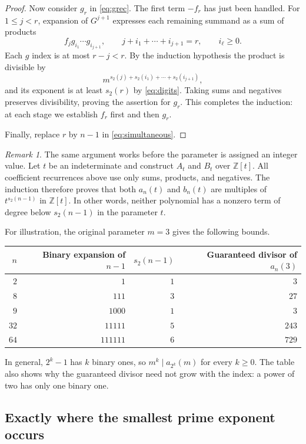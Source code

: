 \documentclass[11pt,a4paper]{article}
\theoremstyle{remark}
\newtheorem{remark}[theorem]{Remark}
\newcommand{\Z}{\mathbb Z}
\begin{document}
\begin{proof}
Now consider $g_r$ in \eqref{eq:grec}. The first term $-f_r$ has just
been handled. For $1\le j<r$, expansion of $G^{j+1}$ expresses each
remaining summand as a sum of products
\[
 f_jg_{i_1}\cdots g_{i_{j+1}},\qquad
 j+i_1+\cdots+i_{j+1}=r,
 \qquad i_\ell\ge0.
\]
Each $g$ index is at most $r-j<r$. By the induction hypothesis the product
is divisible by
\[
 m^{s_2(j)+s_2(i_1)+\cdots+s_2(i_{j+1})},
\]
and its exponent is at least $s_2(r)$ by \eqref{eq:digits}.
Taking sums and negatives preserves divisibility, proving the assertion
for $g_r$. This completes the induction: at each stage we establish $f_r$
first and then $g_r$.

Finally, replace $r$ by $n-1$ in \eqref{eq:simultaneous}.
\end{proof}

\begin{remark}\label{rem:polynomial}
The same argument works before the parameter is assigned an integer value.
Let $t$ be an indeterminate and construct $A_t$ and $B_t$ over $\Z[t]$.
All coefficient recurrences above use only sums, products, and negatives. The induction
therefore proves that both $a_n(t)$ and $b_n(t)$ are multiples of
$t^{s_2(n-1)}$ in $\Z[t]$. In other words, neither polynomial has a
nonzero term of degree below $s_2(n-1)$ in the parameter $t$.
\end{remark}

For illustration, the original parameter $m=3$ gives the following bounds.
\begin{center}
\begin{tabular}{@{}rrrr@{}}
\toprule
$n$ & Binary expansion of $n-1$ & $s_2(n-1)$ & Guaranteed divisor of $a_n(3)$\\
\midrule
$2$ & $1$ & $1$ & $3$\\
$8$ & $111$ & $3$ & $27$\\
$9$ & $1000$ & $1$ & $3$\\
$32$ & $11111$ & $5$ & $243$\\
$64$ & $111111$ & $6$ & $729$\\
\bottomrule
\end{tabular}
\end{center}
In general, $2^k-1$ has $k$ binary ones, so
$m^k\mid a_{2^k}(m)$ for every $k\ge0$. The table also shows why the
guaranteed divisor need not grow with the index: a power of two has only
one binary one.

\subsection{Exactly where the smallest prime exponent occurs}
\end{document}
